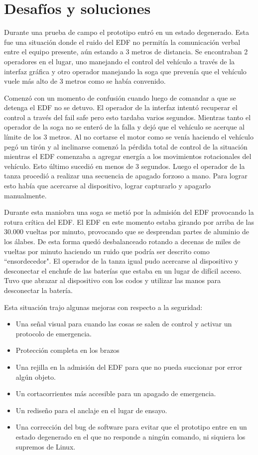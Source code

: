 \section{Desafíos y soluciones}\label{sec:challenges-solutions}
Durante una prueba de campo el prototipo entró en un estado degenerado. Esta fue una situación donde el ruido del EDF no permitía la comunicación verbal entre el equipo presente, aún estando a 3 metros de distancia. Se encontraban 2 operadores en el lugar, uno manejando el control del vehículo a través de la interfaz gráfica y otro operador manejando la soga que prevenía que el vehículo vuele más alto de 3 metros como se había convenido.

Comenzó con un momento de confusión cuando luego de comandar a que se detenga el EDF no se detuvo. El operador de la interfaz intentó recuperar el control a través del fail safe pero esto tardaba varios segundos. Mientras tanto el operador de la soga no se enteró de la falla y dejó que el vehículo se acerque al límite de los 3 metros. Al no cortarse el motor como se venía haciendo el vehículo pegó un tirón y al inclinarse comenzó la pérdida total de control de la situación mientras el EDF comenzaba a agregar energía a los movimientos rotacionales del vehículo. Esto último sucedió en menos de 3 segundos. Luego el operador de la tanza procedió a realizar una secuencia de apagado forzoso a mano. Para lograr esto había que acercarse al dispositivo, lograr capturarlo y apagarlo manualmente.

Durante esta maniobra una soga se metió por la admisión del EDF provocando la rotura crítica del EDF. El EDF en este momento estaba girando por arriba de las 30.000 vueltas por minuto, provocando que se desprendan partes de aluminio de los álabes. De esta forma quedó desbalanceado rotando a decenas de miles de vueltas por minuto haciendo un ruido que podría ser descrito como ``ensordecedor". El operador de la tanza igual pudo acercarse al dispositivo y desconectar el enchufe de las baterías que estaba en un lugar de difícil acceso. Tuvo que abrazar al dispositivo con los codos y utilizar las manos para desconectar la batería.

Esta situación trajo algunas mejoras con respecto a la seguridad:

\begin{itemize}
    \item Una señal visual para cuando las cosas se salen de control y activar un protocolo de emergencia.
    \item Protección completa en los brazos
    \item Una rejilla en la admisión del EDF para que no pueda succionar por error algún objeto.
    \item Un cortacorrientes más accesible para un apagado de emergencia.
    \item Un rediseño para el anclaje en el lugar de ensayo.
    \item Una corrección del bug de software para evitar que el prototipo entre en un estado degenerado en el que no responde a ningún comando, ni siquiera los supremos de Linux.
\end{itemize}

